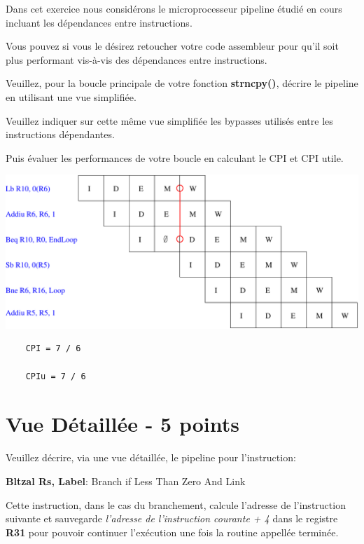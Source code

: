 {Dans cet exercice nous consid\'erons le microprocesseur pipeline \'etudi\'e
en cours incluant les d\'ependances entre instructions.

Vous pouvez si vous le d\'esirez retoucher votre code assembleur
pour qu'il soit plus performant vis-\`a-vis des d\'ependances entre
instructions.

Veuillez, pour la boucle principale de votre fonction \textbf{strncpy()},
d\'ecrire le pipeline en utilisant une vue simplifi\'ee.

Veuillez indiquer sur cette m\^eme vue simplifi\'ee les bypasses utilis\'es
entre les instructions d\'ependantes.

Puis \'evaluer les performances de votre boucle en calculant le CPI et CPI
utile.

\begin{correction}

  \begin{center}
    \includegraphics[scale=0.8]{figures/correction-vue-simplifiee.pdf}
  \end{center}

  \begin{verbatim}
    CPI = 7 / 6

    CPIu = 7 / 6
  \end{verbatim}

\end{correction}

%
%

\section{Vue D\'etaill\'ee - 5 points}

Veuillez d\'ecrire, via une vue d\'etaill\'ee, le pipeline pour l'instruction:

\textbf{Bltzal Rs, Label}: Branch if Less Than Zero And Link

Cette instruction, dans le cas du branchement, calcule l'adresse de
l'instruction suivante et sauvegarde \textit{l'adresse de l'instruction
courante + 4} dans le registre \textbf{R31} pour pouvoir continuer
l'ex\'ecution une fois la routine appell\'ee termin\'ee.

}
